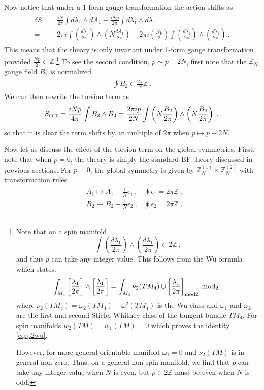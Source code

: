 \documentclass[11pt]{article}
\newcommand{\eq}[1]{\begin{align}\begin{split}#1\end{split}\end{align}}
\def\IZ{{\mathbb{Z}}}
\def\beq{\begin{equation}}
\def\eeq{\end{equation}}
\begin{document}
Now notice that under a 1-form gauge transformation the action shifts as 
%
\eq{
\delta S =& \frac{iN}{2\pi} \int d \lambda_1 \wedge d A_1 - \frac{iNp}{2\pi} \int d\lambda_1 \wedge d \lambda_1 \\
=& 2\pi i \int \left( \frac{d \lambda_1}{2\pi} \right) \wedge \left( N \frac{dA_1}{2\pi} \right) - 2\pi i\left( \frac{Np}{2} \right) \int \left( \frac{d \lambda_1}{2\pi} \right) \wedge  \left( \frac{d \lambda_1}{2\pi} \right)~.
}
%
This means that the theory is only invariant under 1-form gauge transformation provided $\frac{Np}{2} \in \IZ$.\footnote{Note that on a spin manifold 
%
\beq\label{eq:p2wu}
\int \left( \frac{d \lambda_1}{2\pi} \right) \wedge  \left( \frac{d \lambda_1}{2\pi} \right) \in  2 \IZ~,
\eeq
and thus  $p$ can take any integer value. This follows from the Wu formula which states:
\beq
\int_{M_4} \left[ \frac{\lambda_1}{2\pi} \right] \wedge \left[ \frac{\lambda_1}{2\pi} \right] = \int_{M_4} \nu_2 (TM_4) \cup \left[ \frac{\lambda_1}{2\pi} \right]_{\rm mod 2} \; \text{mod}_2~,
\eeq
%
where $\nu_2 (TM_4) = \omega_2 (TM_4) + \omega_1^2 (TM_4)$ is the Wu class and $\omega_1$ and $\omega_2$ are the first and second Stiefel-Whitney class of the tangent bundle $TM_4$. 
For spin manifolds $w_2(TM)=w_1(TM)=0$ which proves the identity \eqref{eq:p2wu}. 

However, for more general  orientable manifold $\omega_1 = 0$ and $\nu_2(TM)$ is in general non-zero. Thus, on a general non-spin manifold, we find that $p$ can take any integer value  when $N$ is even, but $p\in 2\IZ$ must be even when $N$ is odd. 
}
%
To see the second condition, $p \sim p + 2N$,  
first note that the $\IZ_N$ gauge field $B_2$ is normalized 
\eq{
\oint B_2\in \frac{2\pi}{N}\IZ~. 
} 
We can then rewrite  the torsion term as 
%
\beq
S_{\scriptscriptstyle \rm SPT} = \frac{iNp}{4\pi} \int B_2 \wedge B_2 = \frac{2\pi i p}{2N} \int \left( N  \frac{B_2}{2\pi} \right) \wedge \left( N  \frac{B_2}{2\pi} \right)~, 
\eeq
%
so that it is clear the term shifts by an multiple of $2\pi$ when 
$p\mapsto p+2N$.  

\bigskip Now let us discuss the effect of the torsion term on the global symmetries. 
First, note that when $p=0$, the theory is simply the standard  BF theory discussed in previous sections. For $p=0$, the global symmetry is given by $\IZ_N^{(1)} \times \IZ_N^{(2)}$ with transformation rules   
\eq{
& A_1 \longmapsto A_1 + \frac{1}{N} \epsilon_1~, \;\;\; \oint \epsilon_1 = 2\pi \IZ~, \\
& B_2 \longmapsto B_2 + \frac{1}{N} \epsilon_2~, \;\;\; \oint \epsilon_2 = 2\pi \IZ~,
}
%
\end{document}
